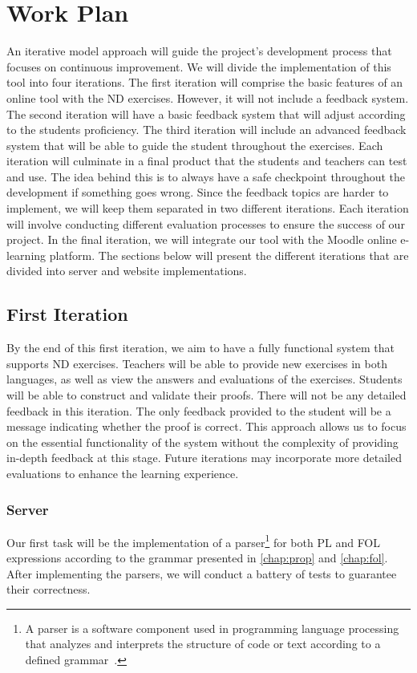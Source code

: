 \section{Work Plan}
An iterative model approach will guide the project's development process that focuses on continuous improvement. We will divide the implementation of this tool into four iterations. The first iteration will comprise the basic features of an online tool with the \gls{ND} exercises. However, it will not include a feedback system. The second iteration will have a basic feedback system that will adjust according to the students proficiency. The third iteration will include an advanced feedback system that will be able to guide the student throughout the exercises. Each iteration will culminate in a final product that the students and teachers can test and use. The idea behind this is to always have a safe checkpoint throughout the development if something goes wrong. Since the feedback topics are harder to implement, we will keep them separated in two different iterations. Each iteration will involve conducting different evaluation processes to ensure the success of our project. In the final iteration, we will integrate our tool with the Moodle online e-learning platform. The sections below will present the different iterations that are divided into server and website implementations.

\subsection{First Iteration}
By the end of this first iteration, we aim to have a fully functional system that supports \gls{ND} exercises. Teachers will be able to provide new exercises in both languages, as well as view the answers and evaluations of the exercises. Students will be able to construct and validate their proofs. There will not be any detailed feedback in this iteration. The only feedback provided to the student will be a message indicating whether the proof is correct. This approach allows us to focus on the essential functionality of the system without the complexity of providing in-depth feedback at this stage. Future iterations may incorporate more detailed evaluations to enhance the learning experience.

\subsubsection{Server}
Our first task will be the implementation of a parser\footnote{A parser is a software component used in programming language processing that analyzes and interprets the structure of code or text according to a defined grammar~\cite{afroozeh_2015_one}.} for both \gls{PL} and \gls{FOL} expressions according to the grammar presented in \ref{chap:prop} and \ref{chap:fol}. After implementing the parsers, we will conduct a battery of tests to guarantee their correctness. 

